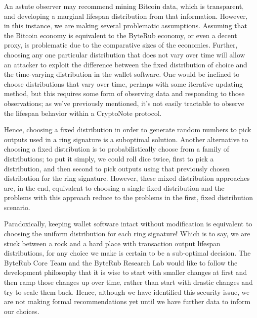 \documentclass[12pt,english]{mrl}
\theoremstyle{definition}
\numberwithin{equation}{section}
\numberwithin{figure}{section}
\numberwithin{equation}{section}
\numberwithin{equation}{section}
\numberwithin{figure}{section}
\begin{document}
An astute observer may recommend mining Bitcoin data, which is transparent, and developing a marginal lifespan distribution from that information. However, in this instance, we are making several problematic assumptions. Assuming that the Bitcoin economy is equivalent to the ByteRub economy, or even a decent proxy, is problematic due to the comparative sizes of the economies. Further, choosing any one particular distribution that does not vary over time will allow an attacker to exploit the difference between the fixed distribution of choice and the time-varying distribution in the wallet software. One would be inclined to choose distributions that vary over time, perhaps with some iterative updating method, but this requires some form of observing data and responding to those observations; as we've previously mentioned, it's not easily tractable to observe the lifespan behavior within a CryptoNote protocol.

Hence, choosing a fixed distribution in order to generate random numbers to pick outputs used in a ring signature is a suboptimal solution. Another alternative to choosing a fixed distribution is to probabilistically choose from a family of distributions; to put it simply, we could roll dice twice, first to pick a distribution, and then second to pick outputs using that previously chosen distribution for the ring signature. However, these mixed distribution approaches are, in the end, equivalent to choosing a single fixed distribution and the problems with this approach reduce to the problems in the first, fixed distribution scenario.

Paradoxically, keeping wallet software intact without modification is equivalent to choosing the uniform distribution for each ring signature! Which is to say, we are stuck between a rock and a hard place with transaction output lifespan distributions, for any choice we make is certain to be a sub-optimal decision. The ByteRub Core Team and the ByteRub Research Lab would like to follow the development philosophy that it is wise to start with smaller changes at first and then ramp those changes up over time, rather than start with drastic changes and try to scale them back. Hence, although we have identified this security issue, we are not making formal recommendations yet until we have further data to inform our choices.
\end{document}
